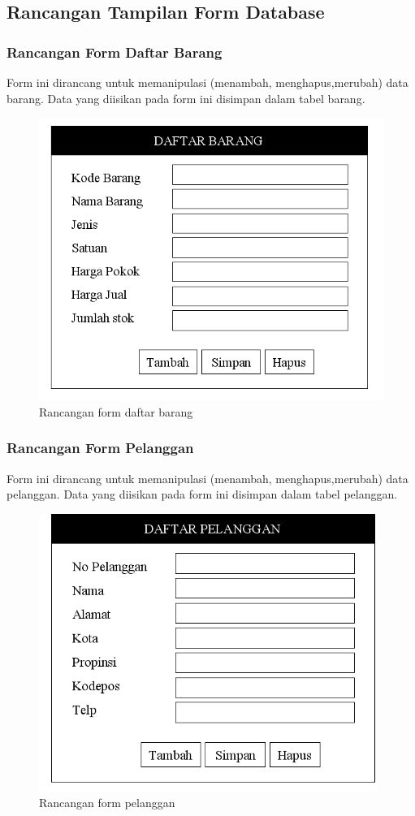 \documentclass{article}
\begin{document}
\subsection{Rancangan Tampilan Form Database}
\subsubsection{Rancangan Form Daftar Barang}
Form ini dirancang untuk memanipulasi (menambah, menghapus,merubah) data barang. Data yang diisikan pada form ini disimpan dalam tabel barang.
    \begin{figure}[htp]
        \centering
        \includegraphics[width=12cm]{gambar_3_2.png}
        \caption{Rancangan form daftar barang}
        \label{fig:my_label2}
    \end{figure}
    \newpage
\subsubsection{Rancangan Form Pelanggan}
Form ini dirancang untuk memanipulasi (menambah, menghapus,merubah) data pelanggan. Data yang diisikan pada form ini disimpan dalam tabel pelanggan.
\begin{figure}[htp]
    \centering
    \includegraphics[width=11cm]{gambar_3_3.png}
    \caption{Rancangan form pelanggan}
    \label{fig:my_label3}
\end{figure}
\end{document}
